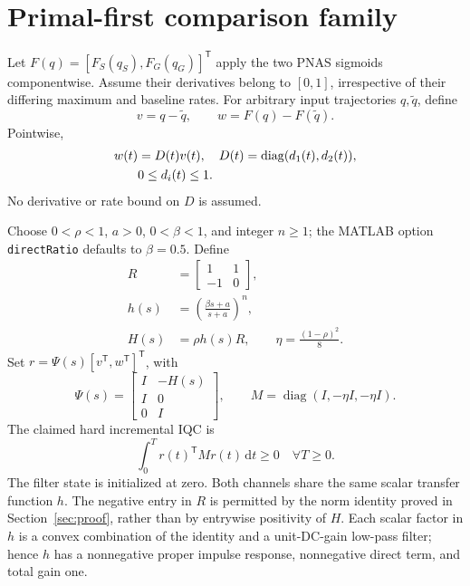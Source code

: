 \documentclass[final,5p,twocolumn]{elsarticle}
\theoremstyle{definition}
\theoremstyle{remark}
\DeclareMathOperator{\diag}{diag}
\newcommand{\T}{\mathsf{T}}
\begin{document}


\section{Primal-first comparison family}\label{sec:family}
Let $F(q)=[F_S(q_S),F_G(q_G)]^{\T}$ apply the two PNAS sigmoids componentwise. Assume their derivatives belong to $[0,1]$, irrespective of their differing maximum and baseline rates. For arbitrary input trajectories $q,\tilde q$, define
\begin{equation}\label{eq:vw}
 v=q-\tilde q,\qquad w=F(q)-F(\tilde q).
\end{equation}
Pointwise,
\begin{align}\label{eq:slope}
 w(t)&=D(t)v(t),\quad D(t)=\diag(d_1(t),d_2(t)),\notag\\
 &0\le d_i(t)\le1.
\end{align}
No derivative or rate bound on $D$ is assumed.

Choose $0<\rho<1$, $a>0$, $0<\beta<1$, and integer $n\ge1$; the MATLAB option \texttt{directRatio} defaults to $\beta=0.5$. Define
\begin{align}
 R&=\begin{bmatrix}1&1\\-1&0\end{bmatrix},\label{eq:R}\\
 h(s)&=\left(\frac{\beta s+a}{s+a}\right)^n,\label{eq:h}\\
 H(s)&=\rho h(s)R,\qquad \eta=\frac{(1-\rho)^2}{8}.\label{eq:H}
\end{align}
Set $r=\Psi(s)[v^{\T},w^{\T}]^{\T}$, with
\begin{equation}\label{eq:psi}
\Psi(s)=\begin{bmatrix}I&-H(s)\\ I&0\\0&I\end{bmatrix},\qquad
M=\diag(I,-\eta I,-\eta I).
\end{equation}
The claimed hard incremental IQC is
\begin{equation}\label{eq:iqc}
\boxed{\int_0^T r(t)^{\T}Mr(t)\,\mathrm dt\ge0\quad\forall T\ge0.}
\end{equation}
The filter state is initialized at zero. Both channels share the same scalar transfer function $h$. The negative entry in $R$ is permitted by the norm identity proved in Section~\ref{sec:proof}, rather than by entrywise positivity of $H$. Each scalar factor in $h$ is a convex combination of the identity and a unit-DC-gain low-pass filter; hence $h$ has a nonnegative proper impulse response, nonnegative direct term, and total gain one.
\end{document}
